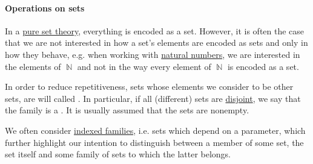 \paragraph{Operations on sets}

\begin{remark}\label{rem:family_of_sets}
  In a \hyperref[rem:pure_set_theory]{pure set theory}, everything is encoded as a set. However, it is often the case that we are not interested in how a set's elements are encoded as sets and only in how they behave, e.g. when working with \hyperref[def:natural_numbers]{natural numbers}, we are interested in the elements of \( \BbbN \) and not in the way every element of \( \BbbN \) is encoded as a set.

  In order to reduce repetitiveness, sets whose elements we consider to be other sets, are will called . In particular, if all (different) sets are \hyperref[def:subset_ordering]{disjoint}, we say that the family is a . It is usually assumed that the sets are nonempty.

  We often consider \hyperref[def:indexed_family]{indexed families}, i.e. sets which depend on a parameter, which further highlight our intention to distinguish between a member of some set, the set itself and some family of sets to which the latter belongs.
\end{remark}

